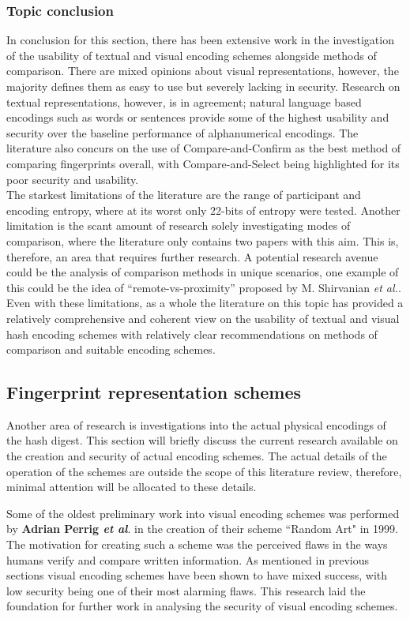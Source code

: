 \subsubsection{Topic conclusion}

In conclusion for this section, there has been extensive work in the investigation of the usability of textual and visual encoding schemes alongside methods of comparison. There are mixed opinions about visual representations, however, the majority defines them as easy to use but severely lacking in security. Research on textual representations, however, is in agreement; natural language based encodings such as words or sentences provide some of the highest usability and security over the baseline performance of alphanumerical encodings. The literature also concurs on the use of Compare-and-Confirm as the best method of comparing fingerprints overall, with Compare-and-Select being highlighted for its poor security and usability.\\
The starkest limitations of the literature are the range of participant and encoding entropy, where at its worst only 22-bits of entropy were tested. Another limitation is the scant amount of research solely investigating modes of comparison, where the literature only contains two papers with this aim. This is, therefore, an area that requires further research. A potential research avenue could be the analysis of comparison methods in unique scenarios, one example of this could be the idea of ``remote-vs-proximity'' proposed by M. Shirvanian \textit{et al.}\cite{shirvanian2017pitfalls}. Even with these limitations, as a whole the literature on this topic has provided a relatively comprehensive and coherent view on the usability of textual and visual hash encoding schemes with relatively clear recommendations on methods of comparison and suitable encoding schemes.

\subsection{Fingerprint representation schemes}
Another area of research is investigations into the actual physical encodings of the hash digest. This section will briefly discuss the current research available on the creation and security of actual encoding schemes. The actual details of the operation of the schemes are outside the scope of this literature review, therefore, minimal attention will be allocated to these details.

Some of the oldest preliminary work into visual encoding schemes was performed by \textbf{Adrian Perrig \textit{et al}}\cite{perrig1999hash}. in the creation of their scheme ``Random Art" in 1999. The motivation for creating such a scheme was the perceived flaws in the ways humans verify and compare written information. As mentioned in previous sections visual encoding schemes have been shown to have mixed success, with low security being one of their most alarming flaws. This research laid the foundation for further work in analysing the security of visual encoding schemes.

